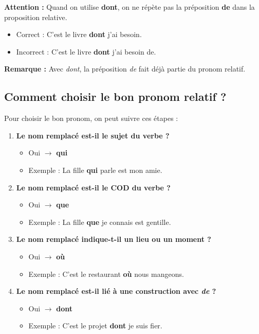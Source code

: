 \documentclass[math,code]{amznotes}
\theoremstyle{remark}
\begin{document}
\begin{notebox}
\textbf{Attention :} Quand on utilise \textbf{dont}, on ne répète pas la préposition \textbf{de} dans la proposition relative.

\begin{itemize}
    \item Correct : C'est le livre \textbf{dont} j'ai besoin.
    \item Incorrect : C'est le livre \textbf{dont} j'ai besoin de.
\end{itemize}

\textbf{Remarque :} Avec \textit{dont}, la préposition \textit{de} fait déjà partie du pronom relatif.
\end{notebox}

\subsection*{Comment choisir le bon pronom relatif ?}

Pour choisir le bon pronom, on peut suivre ces étapes :

\begin{enumerate}
    \item \textbf{Le nom remplacé est-il le sujet du verbe ?}
    \begin{itemize}
        \item Oui $\rightarrow$ \textbf{qui}
        \item Exemple : La fille \textbf{qui} parle est mon amie.
    \end{itemize}

    \item \textbf{Le nom remplacé est-il le COD du verbe ?}
    \begin{itemize}
        \item Oui $\rightarrow$ \textbf{que}
        \item Exemple : La fille \textbf{que} je connais est gentille.
    \end{itemize}

    \item \textbf{Le nom remplacé indique-t-il un lieu ou un moment ?}
    \begin{itemize}
        \item Oui $\rightarrow$ \textbf{où}
        \item Exemple : C'est le restaurant \textbf{où} nous mangeons.
    \end{itemize}

    \item \textbf{Le nom remplacé est-il lié à une construction avec \textit{de} ?}
    \begin{itemize}
        \item Oui $\rightarrow$ \textbf{dont}
        \item Exemple : C'est le projet \textbf{dont} je suis fier.
    \end{itemize}
\end{enumerate}
\end{document}
